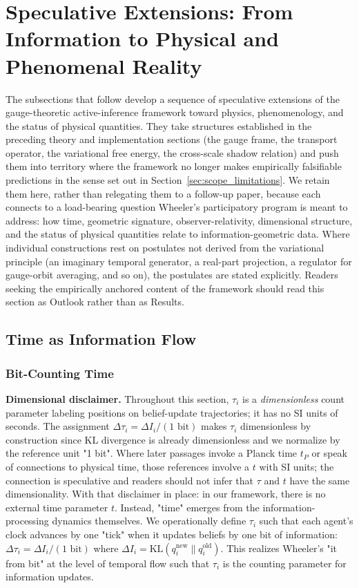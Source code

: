 \documentclass[11pt]{article}
\begin{document}
\section{Speculative Extensions: From Information to Physical and Phenomenal Reality}
\label{sec:speculative_extensions}

The subsections that follow develop a sequence of speculative extensions of the gauge-theoretic active-inference framework toward physics, phenomenology, and the status of physical quantities. They take structures established in the preceding theory and implementation sections (the gauge frame, the transport operator, the variational free energy, the cross-scale shadow relation) and push them into territory where the framework no longer makes empirically falsifiable predictions in the sense set out in Section~\ref{sec:scope_limitations}. We retain them here, rather than relegating them to a follow-up paper, because each connects to a load-bearing question Wheeler's participatory program is meant to address: how time, geometric signature, observer-relativity, dimensional structure, and the status of physical quantities relate to information-geometric data. Where individual constructions rest on postulates not derived from the variational principle (an imaginary temporal generator, a real-part projection, a regulator for gauge-orbit averaging, and so on), the postulates are stated explicitly. Readers seeking the empirically anchored content of the framework should read this section as Outlook rather than as Results.

\subsection{Time as Information Flow}

\subsubsection{Bit-Counting Time}

\textbf{Dimensional disclaimer.} Throughout this section, $\tau_i$ is a \emph{dimensionless} count parameter labeling positions on belief-update trajectories; it has no SI units of seconds. The assignment $\Delta \tau_i = \Delta I_i / (1\text{ bit})$ makes $\tau_i$ dimensionless by construction since KL divergence is already dimensionless and we normalize by the reference unit "1 bit". Where later passages invoke a Planck time $t_P$ or speak of connections to physical time, those references involve a $t$ with SI units; the connection is speculative and readers should not infer that $\tau$ and $t$ have the same dimensionality. With that disclaimer in place: in our framework, there is no external time parameter $t$. Instead, "time" emerges from the information-processing dynamics themselves. We operationally define $\tau_i$ such that each agent's clock advances by one "tick" when it updates beliefs by one bit of information: $\Delta \tau_i = \Delta I_i / (1 \text{ bit})$ where $\Delta I_i = \mathrm{KL}(q_i^{\text{new}} \| q_i^{\text{old}})$. This realizes Wheeler's "it from bit" at the level of temporal flow such that $\tau_i$ is the counting parameter for information updates.
\end{document}
